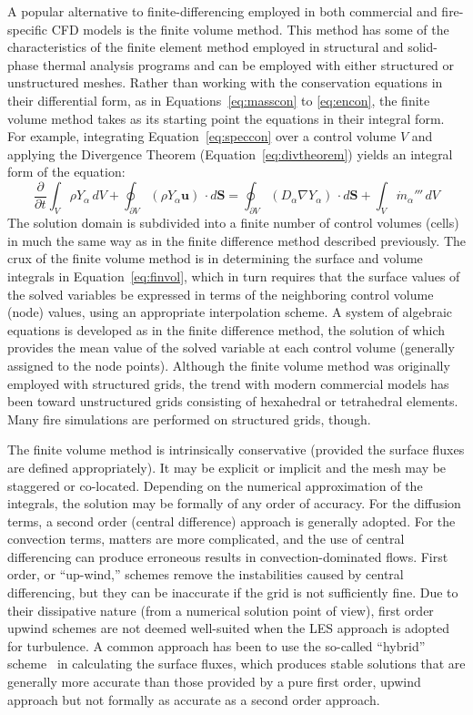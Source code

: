 \documentclass[graybox]{svmult}
\begin{document}
A popular alternative to finite-differencing employed in both commercial and fire-specific CFD models is the finite volume method. This method has some of the characteristics of the finite  element method employed in structural and solid-phase thermal analysis programs and can be employed with either structured or unstructured meshes. Rather than working with the conservation equations in their differential form, as in Equations~\ref{eq:masscon} to \ref{eq:encon}, the finite volume method takes as its starting point the equations in their integral form. For example, integrating Equation~\ref{eq:speccon} over a control volume $V$  and applying the Divergence Theorem (Equation~\ref{eq:divtheorem}) yields an integral form of the equation:
\begin{equation}
\frac{\partial}{\partial t} \int_V \rho Y_\alpha \, dV + \oint_{\partial V} (\rho Y_\alpha \mathbf{u} ) \, \cdot d\mathbf{S} = \oint_{\partial V} (D_\alpha \nabla Y_\alpha) \, \cdot  d\mathbf{S} + \int_V \dot{m}_\alpha''' \, dV
\label{eq:finvol}
\end{equation}
The solution domain is subdivided into a finite number of control volumes (cells) in much the same way as in the finite difference method described previously. The crux of the finite volume method is in determining the surface and volume integrals in Equation~\ref{eq:finvol}, which in turn requires that the surface values of the solved variables be expressed in terms of the neighboring control volume (node) values, using an appropriate interpolation scheme. A system of algebraic equations is developed as in the finite difference method, the solution of which provides the mean value of the solved variable at each control volume (generally assigned to the node points). Although the finite volume method was originally employed with structured grids, the trend with modern commercial models has been toward unstructured grids consisting of hexahedral or tetrahedral elements. Many fire simulations are performed on structured grids, though.

The finite volume method is intrinsically conservative (provided the surface fluxes are defined appropriately). It may be explicit or implicit and the mesh may be staggered or co-located. Depending on the numerical approximation of the integrals, the solution may be formally of any order of accuracy. For the diffusion terms, a second order (central difference) approach is generally adopted. For the convection terms, matters are more complicated, and the use of central differencing can produce erroneous results in convection-dominated flows. First order, or ``up-wind,'' schemes remove the instabilities caused by central differencing, but they can be inaccurate if the grid is not sufficiently fine. Due to their dissipative nature (from a numerical solution point of view), first order upwind schemes are not deemed well-suited when the LES approach is adopted for turbulence. A common approach has been to use the so-called ``hybrid'' scheme~\cite{Spalding:1972} in calculating the surface fluxes, which produces stable solutions that are generally more accurate than those provided by a pure first order, upwind approach but not formally as accurate as a second order approach.
\end{document}
